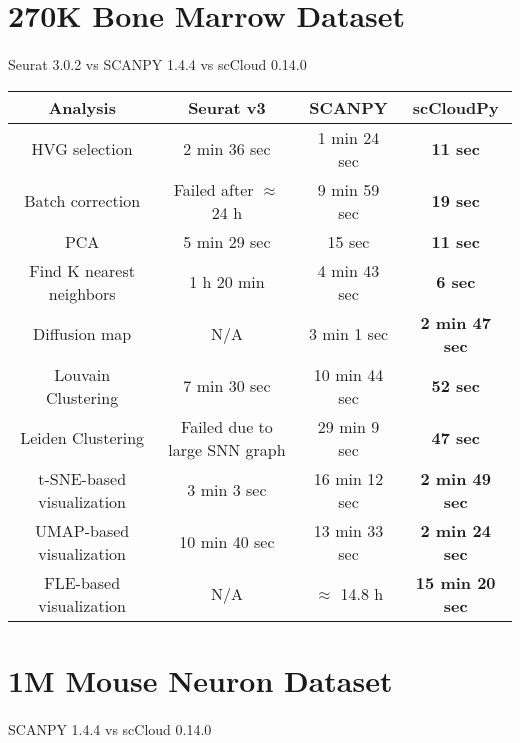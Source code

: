 \documentclass[10pt]{article}
\begin{document}
\section{270K Bone Marrow Dataset}

\paragraph{}
Seurat 3.0.2 \qquad vs \qquad SCANPY 1.4.4 \qquad vs \qquad scCloud 0.14.0

\begin{table}[H]
	\centering
	\begin{tabular}{|c|c|c|c|}
		\hline
		Analysis & Seurat v3 & SCANPY & scCloudPy\\
		\hline \hline
		HVG selection & 2 min 36 sec & 1 min 24 sec & \textbf{11 sec} \\
		\hline
		Batch correction & Failed after $\approx$ 24 h & 9 min 59 sec & \textbf{19 sec} \\
		\hline
		PCA & 5 min 29 sec & 15 sec & \textbf{11 sec} \\
		\hline
		Find K nearest neighbors &  1 h 20 min &  4 min 43 sec & \textbf{6 sec}\\
		\hline
		Diffusion map & N/A & 3 min 1 sec & \textbf{2 min 47 sec} \\
		\hline
		Louvain Clustering & 7 min 30 sec & 10 min 44 sec & \textbf{52 sec} \\
		\hline 
		Leiden Clustering & Failed due to large SNN graph & 29 min 9 sec & \textbf{47 sec}\\
		\hline
		t-SNE-based visualization & 3 min 3 sec & 16 min 12 sec & \textbf{2 min 49 sec}\\
		\hline
		UMAP-based visualization & 10 min 40 sec & 13 min 33 sec  & \textbf{2 min 24 sec}\\
		\hline
		FLE-based visualization & N/A & $\approx$ 14.8  h & \textbf{15 min 20 sec}\\
		\hline
	\end{tabular}
\end{table}

\section{1M Mouse Neuron Dataset}

\paragraph{}
SCANPY 1.4.4 \qquad vs \qquad scCloud 0.14.0
\end{document}

